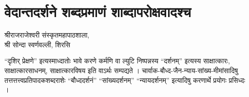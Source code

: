 \chapter{वेदान्तदर्शने शब्दप्रमाणं शाब्दापरोक्षवादश्च}

\begin{center}
\smallskip
 
श्रीराजराजेश्वरी संस्कृतमहापाठशाला,\\
श्री सोन्दा स्वर्णवल्ली, शिरसि
\end{center}

“दृशिर् प्रेक्षणे” इत्यस्माध्दातोः भावे करणे कर्मणि वा ल्युटि निष्पन्नस्य “दर्शनम्” इत्यस्य साक्षात्कारः, साक्षात्कारसाधनम्, साक्षात्कारविषय इति वाऽर्थः सम्पद्यते । चार्वाक-बौध्द-जैन-न्याय-सांख्य-मीमांसादिषु तत्तत्तत्त्वप्रतिपादकशब्दराशेः “बौध्ददर्शनं” “सांख्यदर्शनम्” “न्यायदर्शनम्”  इत्यादिषु करणार्थे प्रयोगः प्रसिध्दः ।

